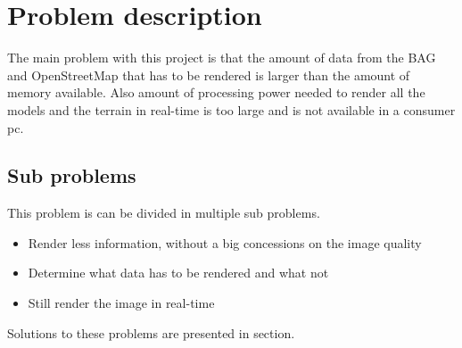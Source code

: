 \chapter{Problem description}
The main problem with this project is that the amount of data from the BAG and OpenStreetMap that has to be rendered is larger than the amount of memory available. Also amount of processing power needed to render all the models and the terrain in real-time is too large and is not available in a consumer pc.

\section{Sub problems}
This problem is can be divided in multiple sub problems.
\begin{itemize}
   \item Render less information, without a big concessions on the image quality
   \item Determine what data has to be rendered and what not
   \item Still render the image in real-time
\end{itemize}
Solutions to these problems are presented in section. 